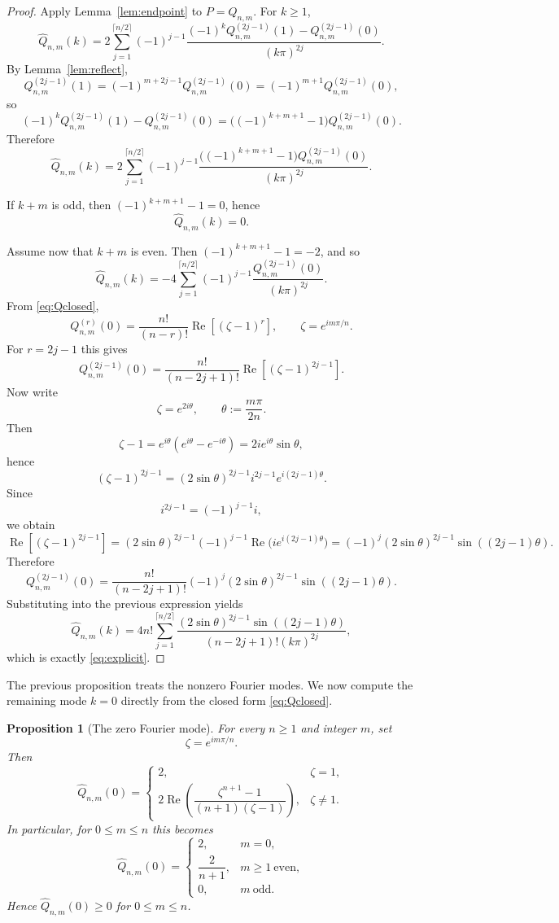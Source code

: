 \documentclass[a4paper,12pt]{amsart}
\newtheorem{proposition}[theorem]{Proposition}
\theoremstyle{definition}
\theoremstyle{remark}
\DeclareMathOperator{\RealPart}{Re}
\renewcommand{\Re}{\RealPart}
\begin{document}
\begin{proof}
Apply Lemma~\ref{lem:endpoint} to $P=Q_{n,m}$. For $k\ge1$,
\[
\widehat Q_{n,m}(k)
=
2 \sum_{j=1}^{\lceil n/2 \rceil} (-1)^{j-1}
\frac{ 
(-1)^k Q_{n,m}^{(2j-1)}(1) - Q_{n,m}^{(2j-1)}(0) 
}{ 
(k\pi)^{2j} 
}.
\]
By Lemma~\ref{lem:reflect},
\[
Q_{n,m}^{(2j-1)}(1)
=
(-1)^{m+2j-1} Q_{n,m}^{(2j-1)}(0)
=
(-1)^{m+1} Q_{n,m}^{(2j-1)}(0),
\]
so
\[
(-1)^k Q_{n,m}^{(2j-1)}(1) - Q_{n,m}^{(2j-1)}(0)
=
\bigl( (-1)^{k+m+1}-1 \bigr) Q_{n,m}^{(2j-1)}(0).
\]
Therefore
\[
\widehat Q_{n,m}(k)
=
2 \sum_{j=1}^{ \lceil n/2\rceil }(-1)^{j-1}
\frac{ 
\bigl((-1)^{k+m+1}-1\bigr) Q_{n,m}^{(2j-1)}(0)
}{
(k\pi)^{2j}
}.
\]

If $k+m$ is odd, then $(-1)^{k+m+1}-1=0$, hence
\[
\widehat Q_{n,m}(k) = 0.
\]

Assume now that $k+m$ is even. Then $(-1)^{k+m+1}-1=-2$, and so
\[
\widehat Q_{n,m}(k)
=
-4 \sum_{j=1}^{\lceil n/2\rceil}(-1)^{j-1}
\frac{ Q_{n,m}^{(2j-1)}(0) }{ (k\pi)^{2j} }.
\]
From \eqref{eq:Qclosed},
\[
Q_{n,m}^{(r)}(0)
=
\frac{n!}{(n-r)!}\Re[(\zeta-1)^r],
\qquad
\zeta = e^{im\pi/n}.
\]
For $r = 2j-1$ this gives
\[
Q_{n,m}^{(2j-1)}(0)
=
\frac{n!}{(n-2j+1)!}\Re[(\zeta-1)^{2j-1}].
\]
Now write
\[
\zeta=e^{2i\theta},
\qquad
\theta:=\frac{m\pi}{2n}.
\]
Then
\[
\zeta-1
=
e^{i\theta}(e^{i\theta}-e^{-i\theta})
=
2i e^{i\theta}\sin\theta,
\]
hence
\[
(\zeta-1)^{2j-1}
=
(2\sin\theta)^{2j-1} i^{2j-1} e^{i(2j-1)\theta}.
\]
Since
\[
i^{2j-1}=(-1)^{j-1} i,
\]
we obtain
\[
\Re[(\zeta-1)^{2j-1}]
=
(2\sin\theta)^{2j-1} (-1)^{j-1} \Re\bigl(i e^{i(2j-1)\theta}\bigr)
=
(-1)^j (2\sin\theta)^{2j-1} \sin((2j-1)\theta).
\]
Therefore
\[
Q_{n,m}^{(2j-1)}(0)
=
\frac{n!}{(n-2j+1)!}
(-1)^j
(2\sin\theta)^{2j-1}\sin((2j-1)\theta).
\]
Substituting into the previous expression yields
\[
\widehat Q_{n,m}(k)
=
4n! \sum_{j=1}^{ \lceil n/2\rceil}
\frac{ (2\sin\theta)^{2j-1}\sin((2j-1)\theta) }
{ (n-2j+1)!(k\pi)^{2j} },
\]
which is exactly \eqref{eq:explicit}.
\end{proof}



The previous proposition treats the nonzero Fourier modes. We now compute the remaining mode $k=0$ directly from the closed form \eqref{eq:Qclosed}.




\begin{proposition}[The zero Fourier mode]
\label{prop:k0}
For every $n\ge1$ and integer $m$, set
\[
\zeta=e^{im\pi/n}.
\]
Then
\[
\widehat Q_{n,m}(0)
=
\begin{cases}
2, & \zeta=1,\\[1ex]
2\Re\!\left(\dfrac{\zeta^{n+1}-1}{(n+1)(\zeta-1)}\right),
& \zeta\ne1.
\end{cases}
\]
In particular, for $0\le m\le n$ this becomes
\[
\widehat Q_{n,m}(0)=
\begin{cases}
2, & m=0,\\[1ex]
\dfrac{2}{n+1}, & m\ge1\ \text{even},\\[1ex]
0, & m\ \text{odd}.
\end{cases}
\]
Hence $\widehat Q_{n,m}(0)\ge0$ for $0\le m\le n$.
\end{proposition}
\end{document}
